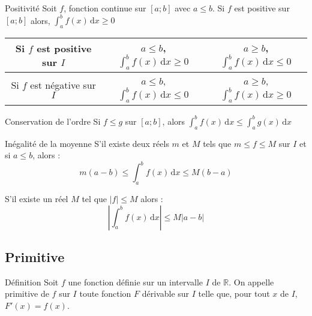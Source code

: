 \medskip

\begin{bclogo}{Positivité}
Soit $f$, fonction continue sur $[a;b]$ avec $a\leqslant b$. Si $f$ est positive sur $[a;b]$ alors, $\int_{a}^{b}f(x)\,\mathrm{d}x\geqslant 0$

\begin{center}
\begin{tabular}{|c|c|c|}
\hline
Si $f$ est positive sur $I$&$a\leqslant b$, $\int_{a}^{b}f(x)\,\mathrm{d}x\geqslant 0$&$a\geqslant b$, $\int_{a}^{b}f(x)\,\mathrm{d}x\leqslant 0$\\
\hline
Si $f$ est négative sur $I$&$a\leqslant b$, $\int_{a}^{b}f(x)\,\mathrm{d}x\leqslant 0$&$a\geqslant b$, $\int_{a}^{b}f(x)\,\mathrm{d}x\geqslant 0$\\
\hline
\end{tabular}
\end{center}
\end{bclogo}

\medskip

\begin{bclogo}{Conservation de l'ordre}
Si $f\leqslant g$ sur $[a;b]$, alors $\int_{a}^{b}f(x)\,\mathrm{d}x\leqslant \int_{a}^{b} g(x)\,\mathrm{d}x$
\end{bclogo}

\medskip

\begin{bclogo}{Inégalité de la moyenne}
S'il existe deux réels $m$ et $M$ tels que $m\leqslant f\leqslant M$ sur $I$ et si $a\leqslant b$, alors : \[m(a-b)\leqslant \int_{a}^{b} f(x)\,\mathrm{d}x\leqslant M(b-a)\]

S'il existe un réel $M$ tel que $|f|\leqslant M$ alors : \[\left| \int_{a}^{b}f(x)\,\mathrm{d}x\right| \leqslant M|a-b|\]
\end{bclogo}

\subsection{Primitive}

\begin{bclogo}{Définition}
Soit $f$ une fonction définie sur un intervalle $I$ de $\mathbb{R}$.
On appelle primitive de $f$ sur $I$ toute fonction $F$ dérivable sur $I$ telle que, pour tout $x$ de $I$, $F'(x) = f(x)$.
\end{bclogo}
\medskip

